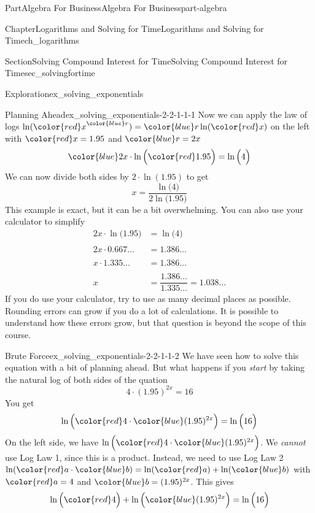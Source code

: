 \documentclass{tufte-book}
\numberwithin{equation}{chapter}
\newcommand{\amp}{&}
\begin{document}
\begin{partptx}{Part}{Algebra For Business}{}{Algebra For Business}{}{}{part-algebra}
\begin{chapterptx}{Chapter}{Logarithms and Solving for Time}{}{Logarithms and Solving for Time}{}{}{ch_logarithms}
\begin{sectionptx}{Section}{Solving Compound Interest for Time}{}{Solving Compound Interest for Time}{}{}{sec_solvingfortime}
\begin{exploration}{Exploration}{}{ex_solving_exponentials}
\begin{enumerate}[font=\bfseries,label=(\alph*),ref=\alph*]
\begin{descriptionlist}
\begin{dlimedium}{Planning Ahead}{ex_solving_exponentials-2-2-1-1-1}
Now we can apply the law of logs \(\ln({\color{red}x}^{\color{blue}r})= {\color{blue}r}\ln({\color{red}x})\) on the left with \(\color{red} x = 1.95\) and \(\color{blue} r = 2x\)%
\begin{equation*}
{\color{blue} 2x} \cdot \ln\Big({\color{red} 1.95}\Big) = \ln\Big(4\Big)
\end{equation*}
We can now divide both sides by \(2\cdot \ln(1.95)\) to get%
\begin{equation*}
x = \dfrac{\ln\Big(4\Big)}{2\ln\Big(1.95\Big)}
\end{equation*}
This example is exact, but it can be a bit overwhelming.  You can also use your calculator to simplify%
\begin{align*}
2x \cdot \ln\Big(1.95\Big) \amp = \ln\Big(4\Big) \\
\\
2x \cdot 0.667\dots \amp = 1.386\dots \\
\\
x\cdot 1.335\dots  \amp = 1.386\dots\\
\\
x \amp = \dfrac{1.386\dots}{1.335\dots} = 1.038\dots
\end{align*}
If you do use your calculator, try to use as many decimal places as possible.  Rounding errors can grow if you do a lot of calculations.  It is possible to understand how these errors grow, but that question is beyond the scope of this course.%
\end{dlimedium}%
\begin{dlimedium}{Brute Force}{ex_solving_exponentials-2-2-1-1-2}%
We have seen how to solve this equation with a bit of planning ahead.  But what happens if you \emph{start} by taking the natural log of both sides of the quation%
\begin{equation*}
4\cdot(1.95)^{2x} = 16
\end{equation*}
You get%
\begin{equation*}
\ln\Big( {\color{red} 4}\cdot{\color{blue} (1.95)^{2x}} \Big) = \ln\Big(16\Big)
\end{equation*}
On the left side, we have \(\ln\Big( {\color{red} 4}\cdot{\color{blue} (1.95)^{2x}} \Big)\).  We \emph{cannot} use Log Law 1, since this is a product.  Instead, we need to use Log Law 2 \(\ln({\color{red} a}\cdot {\color{blue} b}) = \ln({\color{red} a}) + \ln({\color{blue} b})\) with \(\color{red} a=4\) and \(\color{blue} b=(1.95)^{2x}\).  This gives%
\begin{equation*}
\ln\Big( {\color{red} 4}\Big) + \ln\Big({\color{blue} (1.95)^{2x}} \Big) = \ln\Big(16\Big)

\end{equation*}
\end{dlimedium}
\end{descriptionlist}
\end{enumerate}
\end{exploration}
\end{sectionptx}
\end{chapterptx}
\end{partptx}
\end{document}
